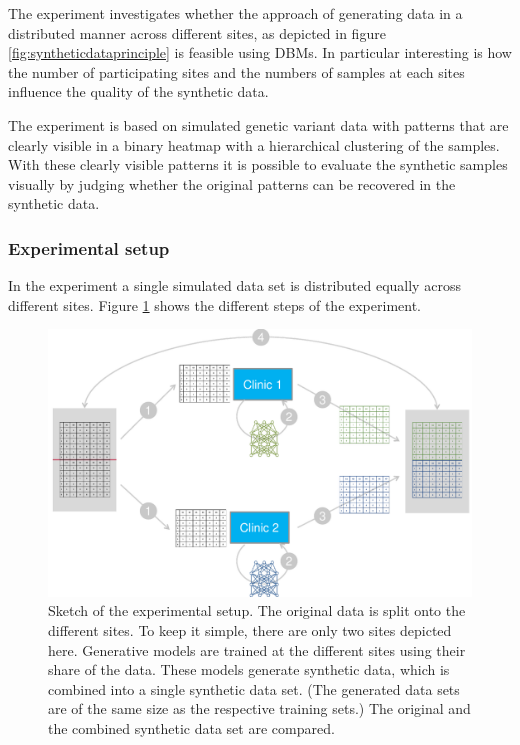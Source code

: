 \documentclass[12pt]{article}
\newcommand{\circlenum}[1]{\raisebox{.5pt}{\textcircled{\raisebox{-.9pt} {#1}}}}
\begin{document}
The experiment investigates whether the approach of generating data in a distributed manner across different sites, as depicted in figure \ref{fig:syntheticdataprinciple} is feasible using DBMs.
In particular interesting is how the number of participating sites and the numbers of samples at each sites influence the quality of the synthetic data.

The experiment is based on simulated genetic variant data with patterns that are clearly visible in a binary heatmap with a hierarchical clustering \citep{hclust} of the  samples.
With these clearly visible patterns it is possible to evaluate the synthetic samples visually by judging whether the original patterns can be recovered in the synthetic data.


\subsubsection{Experimental setup}\label{simuexpsetup}

In the experiment a single simulated data set is distributed equally across different sites.
Figure \ref{fig:experimentalsetup} shows the different steps of the experiment.


\begin{figure}[h]
   \centering
   \includegraphics[scale=0.7]{images/experimentalsetup.pdf}
   \caption{Sketch of the experimental setup.
    \circlenum{1} The original data is split onto the different sites. To keep it simple, there are only two sites depicted here. 
    \circlenum{1} Generative models are trained at the different sites using their share of the data. 
    These models generate synthetic data, which is combined into a single synthetic data set. (The generated data sets are of the same size as the respective training sets.)
    \circlenum{4} The original and the combined synthetic data set are compared.}
   \label{fig:experimentalsetup}
 \end{figure}
 
\end{document}
